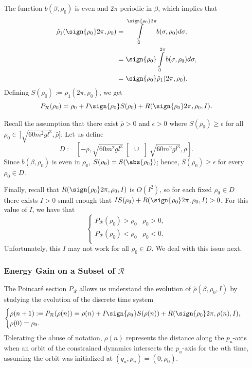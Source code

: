 The function \(b(\beta,\rho_0)\) is even and
\(2\pi\)-periodic in \(\beta\), which implies that
\begin{align*}
    \hat{\rho}_1(\sign{\rho_0}2\pi, \rho_0) &=
    \int \limits_0^{\sign{\rho_0}2\pi} b(\sigma,\rho_0)d\sigma
    , \\
     &=\sign{\rho_0}\int\limits_0^{2\pi}b(\sigma,\rho_0)d\sigma
     , \\
     &= \sign{\rho_0} \hat{\rho}_1(2\pi,\rho_0)
     .
\end{align*}
Defining \(S(\rho_0) := \hat{\rho}_1(2\pi,\rho_0)\),
we get
\[
    P_\mathcal{R}(\rho_0) = \rho_0 + I\sign{\rho_0}S(\rho_0) 
    + R(\sign{\rho_0}2\pi,\rho_0,I)
    .
\]

Recall the assumption that there exist \(\bar{\rho} > 0\) and
\(\epsilon > 0\) where \(S(\rho_0) \geq \epsilon\) for all 
\(\rho_0 \in \,]\sqrt{60m^2gl^3},\bar{\rho}]\).
Let us define
\[
    D := \left[-\bar{\rho},\sqrt{60m^2gl^3}\right[ \, 
    \cup \, 
    \left]\sqrt{60m^2gl^3},\bar{\rho}\right]
    .
\]
Since \(b(\beta,\rho_0)\) is even in \(\rho_0\),
\(S(\rho_0) = S(\abs{\rho_0})\);
hence, \(S(\rho_0) \geq \epsilon\) for every \(\rho_0 \in D\).

Finally, recall that \(R(\sign{\rho_0}2\pi,\rho_0,I)\) is \(O(I^2)\), so 
for each fixed \(\rho_0 \in D\)
there exists \(I > 0\) small enough that 
\( IS(\rho_0) + R(\sign{\rho_0}2\pi,\rho_0,I) > 0\).
For this value of \(I\), we have that
\[
    \begin{cases}
        P_\mathcal{R}(\rho_0) > \rho_0 & \rho_0 > 0
        ,\\
        P_\mathcal{R}(\rho_0) < \rho_0 & \rho_0 < 0
        .\\
    \end{cases}
\]
Unfortunately, this \(I\) may not work for all \(\rho_0 \in D\). We deal
with this issue next.

\subsubsection*{Energy Gain on a Subset of \(\mathcal{R}\)}

The Poincar\'{e} section \(P_\mathcal{R}\) allows us understand the evolution of
\(\hat{\rho}(\beta,\rho_0,I)\) by studying the evolution of the discrete time
system
\begin{equation}\label{eqn:rhohat-discrete}
    \begin{cases}
        \rho(n+1) := P_\mathcal{R}(\rho(n)) 
        = \rho(n) + I\sign{\rho_0}S(\rho(n)) + 
            R(\sign{\rho_0}2\pi,\rho(n),I)
        , \\
        \rho(0) = \rho_0
        .
    \end{cases}
\end{equation}
Tolerating the abuse of notation, \(\rho(n)\) represents the distance along the
\(p_u\)-axis when an orbit of the constrained dynamics intersects the
\(p_u\)-axis for the \(n\)th time, assuming the orbit was initialized at
\((q_u,p_u) = (0,\rho_0)\).

